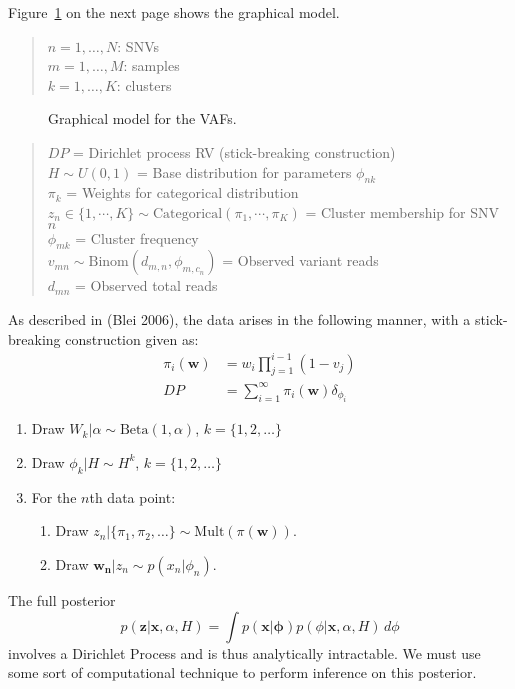 \documentclass[11pt]{article}
\newcommand{\bx}{\ensuremath{\mathbf{x}}}
\newcommand{\bz}{\ensuremath{\mathbf{z}}}
\newcommand{\adjustimg}{%
  \checkoddpage%
  \ifoddpage\hspace*{\dimexpr\evensidemargin-\oddsidemargin}\else\hspace*{-\dimexpr\evensidemargin-\oddsidemargin}\fi%
}
\newcommand{\centerimg}[2][width=\textwidth]{%
  \makebox[\textwidth]{\adjustimg\texttt{[image: \#2]}}%
}
\begin{document}
Figure~\ref{fig:GM} on the next page shows the graphical model.

\newpage
\begin{quote}
$n = 1, \ldots , N$:  SNVs \\
$m = 1, \ldots , M$: samples \\
$k = 1, \ldots ,  K$: clusters
\end{quote}

\begin{figure}[H]
\centerimg[scale=1.0]{multi_pgm.png}
\caption{Graphical model for the VAFs.}
\label{fig:GM}
\end{figure}

\begin{quote}
$DP$ = Dirichlet process RV (stick-breaking construction) \\
$H \sim U(0,1)$ = Base distribution for parameters $\phi_{nk}$	 \\
$\pi_k$ = Weights for categorical distribution \\
$z_{n} \in \{1, \cdots, K\}  \sim \mathrm{Categorical}(\pi_1, \cdots, \pi_K)$ =  Cluster membership for SNV $n$\\
$\phi_{mk}$ = Cluster frequency \\ 
$v_{mn} \sim \mathrm{Binom}(d_{m,n}, \phi_{m,c_n})$ = Observed variant reads\\ 
$d_{mn}$ = Observed total reads
\end{quote}
\vspace{0.05cm}

As described in (Blei 2006), the data arises in the following manner, with a stick-breaking construction given as:
\begin{align*}
\pi_i(\mathbf{w}) &= w_i \prod\limits_{j=1}^{i-1} (1 - v_j) \\
				DP &= \sum_{i=1}^\infty \pi_i(\mathbf{w}) \delta_{\phi_i}
\end{align*}
\begin{enumerate}
	\item Draw $W_k | \alpha \sim \mathrm{Beta}(1, \alpha)$, \hspace{1cm} $k = \{1, 2, \ldots\}$
	\item Draw $\phi_k | H \sim H^k$, \hspace{1cm} $k = \{1, 2, \ldots\}$
	\item For the $n$th data point:
	\begin{enumerate}
		\item Draw $z_n | \{\pi_1, \pi_2, \ldots\} \sim \mathrm{Mult}(\pi(\mathbf{w}))$.
		\item Draw $\mathbf{w_n} | z_n \sim p(x_n | \phi_n)$.
	\end{enumerate}
\end{enumerate}
\vspace{0.05cm}
The full posterior 
\begin{equation}
p(\bz | \bx, \alpha, H) = \int p(\bx | \mathbf{\phi}) p(\phi | \bx, \alpha, H) \, d\phi
\end{equation}
involves a Dirichlet Process and is thus analytically intractable. We must use some sort of computational technique to perform inference on this posterior.
\end{document}
